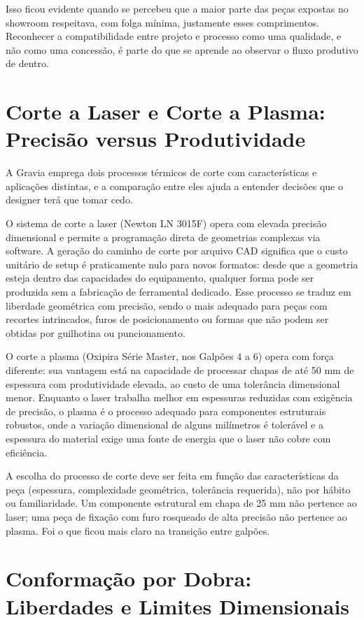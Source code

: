 \documentclass[12pt,a4paper,oneside,brazil,chapter=TITLE]{article}
\newcommand{\secbreak}{\clearpage}
\let\oldsection\section
\renewcommand{\section}{\secbreak\oldsection}
\begin{document}
Isso ficou evidente quando se percebeu que a maior parte das peças expostas no showroom respeitava, com folga mínima, justamente esses comprimentos. Reconhecer a compatibilidade entre projeto e processo como uma qualidade, e não como uma concessão, é parte do que se aprende ao observar o fluxo produtivo de dentro.

\section{Corte a Laser e Corte a Plasma: Precisão versus Produtividade}

A Gravia emprega dois processos térmicos de corte com características e aplicações distintas, e a comparação entre eles ajuda a entender decisões que o designer terá que tomar cedo.

O sistema de corte a laser (Newton LN 3015F) opera com elevada precisão dimensional e permite a programação direta de geometrias complexas via software. A geração do caminho de corte por arquivo CAD significa que o custo unitário de setup é praticamente nulo para novos formatos: desde que a geometria esteja dentro das capacidades do equipamento, qualquer forma pode ser produzida sem a fabricação de ferramental dedicado. Esse processo se traduz em liberdade geométrica com precisão, sendo o mais adequado para peças com recortes intrincados, furos de posicionamento ou formas que não podem ser obtidas por guilhotina ou puncionamento.

O corte a plasma (Oxipira Série Master, nos Galpões 4 a 6) opera com força diferente: sua vantagem está na capacidade de processar chapas de até 50 mm de espessura com produtividade elevada, ao custo de uma tolerância dimensional menor. Enquanto o laser trabalha melhor em espessuras reduzidas com exigência de precisão, o plasma é o processo adequado para componentes estruturais robustos, onde a variação dimensional de alguns milímetros é tolerável e a espessura do material exige uma fonte de energia que o laser não cobre com eficiência.

A escolha do processo de corte deve ser feita em função das características da peça (espessura, complexidade geométrica, tolerância requerida), não por hábito ou familiaridade. Um componente estrutural em chapa de 25 mm não pertence ao laser; uma peça de fixação com furo rosqueado de alta precisão não pertence ao plasma. Foi o que ficou mais claro na transição entre galpões.

\section{Conformação por Dobra: Liberdades e Limites Dimensionais}
\end{document}
